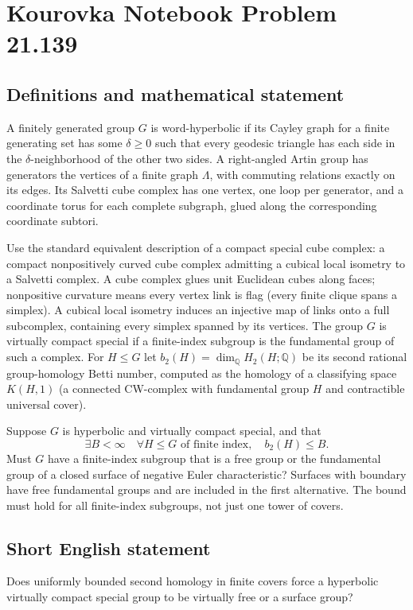 \documentclass[11pt,a4paper]{article}
\begin{document}
\section*{Kourovka Notebook Problem 21.139}\label{statement}

\subsection{Definitions and mathematical statement}
A finitely generated group $G$ is word-hyperbolic if its Cayley graph for a
finite generating set has some $\delta\geq0$ such that every geodesic triangle
has each side in the $\delta$-neighborhood of the other two sides.
A right-angled Artin group has generators the vertices of a finite graph
$\Lambda$, with commuting relations exactly on its edges. Its Salvetti cube
complex has one vertex, one loop per generator, and a coordinate torus for
each complete subgraph, glued along the corresponding coordinate subtori.

Use the standard equivalent description of a compact special cube complex:
a compact nonpositively curved cube complex admitting a cubical local isometry
to a Salvetti complex. A cube complex glues unit Euclidean cubes along faces;
nonpositive curvature means every vertex link is flag (every finite clique
spans a simplex). A cubical local isometry induces an injective map of links
onto a full subcomplex, containing every simplex spanned by its vertices.
The group $G$ is virtually compact special if a
finite-index subgroup is the fundamental group of such a complex.
For $H\leq G$ let $b_2(H)=\dim_{\mathbb Q}H_2(H;\mathbb Q)$ be its second
rational group-homology Betti number, computed as the homology of a
classifying space $K(H,1)$ (a connected CW-complex with fundamental group
$H$ and contractible universal cover).

Suppose $G$ is hyperbolic and virtually compact special, and that
\[
\exists B<\infty\quad\forall H\leq G\text{ of finite index},\quad b_2(H)\leq B.
\]
Must $G$ have a finite-index subgroup that is a free group or the fundamental
group of a closed surface of negative Euler characteristic? Surfaces with
boundary have free fundamental groups and are included in the first alternative.
The bound must hold for all finite-index subgroups, not just one tower of covers.
\subsection{Short English statement}
Does uniformly bounded second homology in finite covers force a hyperbolic virtually compact special group to be virtually free or a surface group?
\end{document}
